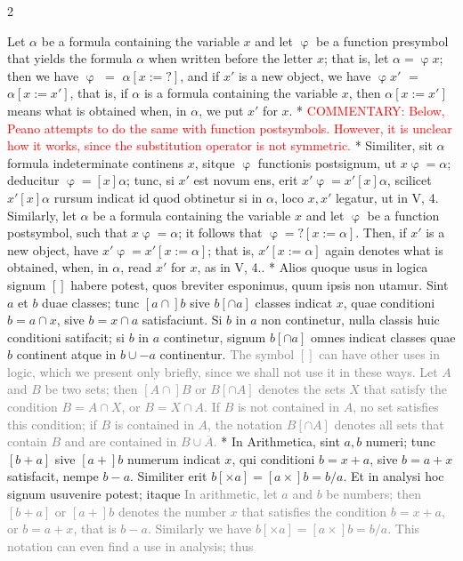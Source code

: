 \documentclass{book}
\newcommand\irrelevant[1]{\textcolor{gray}{#1}}
\newcommand\commentary[1]{\textcolor{red}{COMMENTARY: #1}}
\newenvironment{translateTwoCol}
               { %
                 \columnratio{0.5, 0.5}
                 \begin{paracol}{2}
                 \newcommand{\LAT}{\switchcolumn[0]*}
                 \newcommand{\ENG}{\switchcolumn[1]}
               }
               { %
                 \let\ENG\undefined
                 \let\LAT\undefined
                 \end{paracol}
               }
\begin{document}
\begin{translateTwoCol}
\ENG
Let $\alpha$ be a formula containing the variable $x$ and let $\upvarphi$ be a function presymbol that yields the formula $\alpha$ when written before the letter $x$; that is, let $\alpha = \upvarphi x$; then we have $\upvarphi$ $=$ $\alpha [x := ? ]$, and if $x'$ is a new object, we have $\upvarphi x'$ $=$ $\alpha [x := x']$, that is, if $\alpha$ is a formula containing the variable $x$, then $\alpha[x := x']$ means what is obtained when, in $\alpha$, we put $x'$ for $x$.
\LAT
\ENG
\commentary{Below, Peano attempts to do the same with function postsymbols.  However, it is unclear how it works, since the substitution operator is not symmetric.}
\LAT
Similiter, sit $\alpha$ formula indeterminate continens $x$, sitque $\upvarphi$ functionis postsignum, ut $x \upvarphi = \alpha$; deducitur $\upvarphi = [x] \alpha$; tunc, si $x'$ est novum ens, erit $x' \upvarphi = x' [x] \alpha$, scilicet $x' [x] \alpha$ rursum indicat id quod obtinetur si in $\alpha$, loco $x, x'$ legatur, ut in V, 4.
\ENG
Similarly, let $\alpha$ be a formula containing the variable $x$ and let $\upvarphi$ be a function postsymbol, such that $x\upvarphi = \alpha$; it follows that $\upvarphi = ?[x := \alpha]$. Then, if $x'$ is a new object, have $x' \upvarphi = x'[x := \alpha]$; that is, $x'[x := \alpha]$ again denotes what is obtained, when, in $\alpha$, read $x'$ for $x$, as in V, 4..
\LAT
Alios quoque usus in logica signum $[ ]$ habere potest, quos breviter esponimus, quum ipsis non utamur. Sint $a$ et $b$ duae classes; tunc $[a \cap ]b$ sive $b[ \cap a]$ classes indicat $x$, quae conditioni $b = a \cap x$, sive $b = x \cap a$ satisfaciunt. Si $b$ in $a$ non continetur, nulla classis huic conditioni satifacit; si $b$ in $a$ continetur, signum $b [ \cap a ]$ omnes indicat classes quae $b$ continent atque in $b \cup - a$ continentur.
\ENG
\irrelevant{The symbol $[ ]$ can have other uses in logic, which we present only briefly, since we shall not use it in these ways. Let $A$ and $B$ be two sets; then $[A \cap ]B$ or $B[ \cap A]$ denotes the sets $X$ that satisfy the condition $B = A \cap X$, or $B = X \cap A$. If $B$ is not contained in $A$, no set satisfies this condition; if $B$ is contained in $A$, the notation $B [ \cap A ]$ denotes all sets that contain $B$ and are contained in $B \cup  \overline{A}$.} %
\LAT
In Arithmetica, sint $a, b$ numeri; tunc $[b + a]$ sive $[a +] b$ numerum indicat $x$, qui conditioni $b = x + a$, sive $b = a + x$ satisfacit, nempe $b - a$. Similiter erit $b [ \times a ] = [a \times ] b = b / a$. Et in analysi hoc signum usuvenire potest; itaque
\ENG
\irrelevant{In arithmetic, let $a$ and $b$ be numbers; then $[b + a]$ or $[a +] b$ denotes the number $x$ that satisfies the condition $b = x + a$, or $b = a + x$, that is $b - a$. Similarly we have $b [ \times a ] = [a \times ] b = b / a$. This notation can even find a use in analysis; thus} %
\end{translateTwoCol}
\end{document}
